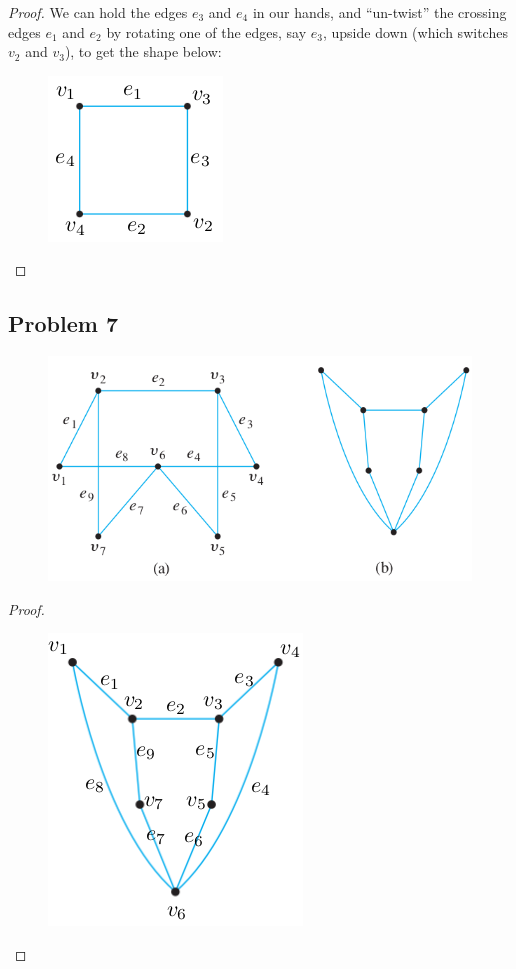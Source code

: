 \documentclass[14pt]{extarticle}
\begin{document}
\begin{proof}
We can hold the edges $e_3$ and $e_4$ in our hands, and ``un-twist'' the
crossing edges $e_1$ and $e_2$ by rotating one of the edges, say $e_3$, upside
down (which switches $v_2$ and $v_3$), to get the shape below:

\begin{figure}[ht!]
\centering
\includegraphics[scale=0.6]{../images/1.4.6.sol.png}
\end{figure}

\end{proof}

\subsection{Problem 7}

\begin{figure}[ht!]
\centering
\includegraphics[scale=0.5]{../images/1.4.7.png}
\end{figure}

\begin{proof}

\begin{figure}[ht!]
\centering
\includegraphics[scale=0.7]{../images/1.4.7.sol.png}
\end{figure}

\end{proof}
\end{document}
